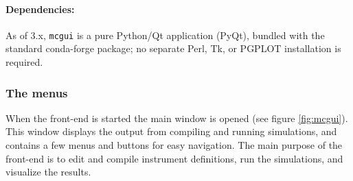 \paragraph{Dependencies:}
As of \MCS 3.x, \verb+mcgui+ is a pure Python/Qt application (PyQt), bundled
with the standard conda-forge \MCS package; no separate Perl, Tk, or PGPLOT
installation is required.

\subsubsection{The menus}

When the front-end is started the main window is opened (see figure
\ref{fig:mcgui}). This window displays the output from compiling and running
simulations, and contains a few menus and buttons for easy navigation. The main
purpose of the front-end is to edit and compile instrument definitions, run the
simulations, and visualize the results.

